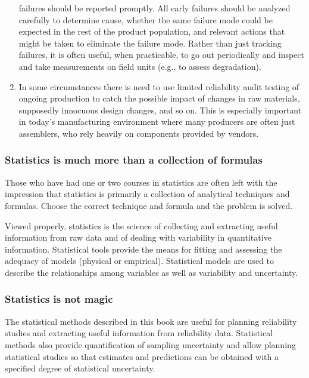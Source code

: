 \begin{enumerate}
failures should be reported promptly.  All early failures should be
analyzed carefully to determine cause, whether the same failure mode
could be expected in the rest of the product population, and
relevant actions that might be taken to eliminate the failure mode.
Rather than just tracking failures, it is often useful, when
practicable, to go out periodically and inspect and take measurements
on field units (e.g., to assess degradation).
\item
In some circumstances there is need to use limited reliability audit
testing of ongoing production to catch the possible impact of
changes in raw materials, supposedly innocuous design changes, and
so on. This is especially important in today's manufacturing
environment where many producers are often just assemblers, who rely
heavily on  components provided by vendors.
\end{enumerate}

\subsubsection{\bf Statistics is much more than a collection of
formulas} Those who have had one or two courses in statistics are
often left with the impression that statistics is primarily a
collection of analytical techniques and formulas. Choose the
correct technique and formula and the problem is solved.

Viewed properly, statistics is the science of collecting and
extracting useful information from raw data and of dealing with
variability in quantitative information.  Statistical tools provide
the means for fitting and assessing the adequacy of models (physical
or empirical). Statistical models are used to describe the
relationships among variables as well as variability and
uncertainty.

\subsubsection{\bf Statistics is not magic}
The statistical methods described in this book are useful for
planning reliability studies and extracting useful information from
reliability data. Statistical methods also provide quantification of
sampling uncertainty and allow planning statistical studies so that
estimates and predictions can be obtained with a specified degree of
statistical uncertainty.

